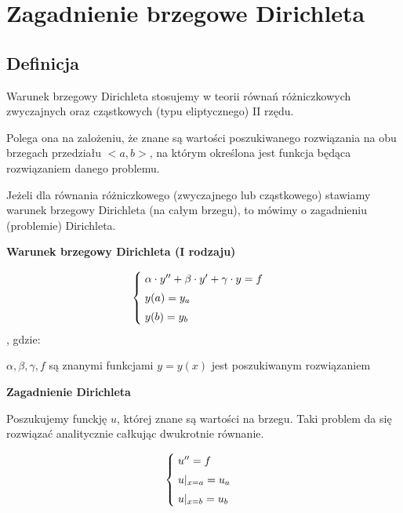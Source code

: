 \section{Zagadnienie brzegowe Dirichleta}
\subsection{Definicja}

Warunek brzegowy Dirichleta stosujemy w teorii równań różniczkowych zwyczajnych oraz cząstkowych (typu eliptycznego) II rzędu.

Polega ona na zalożeniu, że znane są wartości poszukiwanego rozwiązania na obu brzegach przedziału $<a,b>$, na którym określona jest funkcja będąca rozwiązaniem danego problemu.

Jeżeli dla równania różniczkowego (zwyczajnego lub cząstkowego) stawiamy warunek brzegowy Dirichleta (na całym brzegu), to mówimy o zagadnieniu (problemie) Dirichleta. 

\textbf{Warunek brzegowy Dirichleta (I rodzaju)}

\[
\begin{cases}
\vspace{0.1cm} 
\hspace{0,1cm}\alpha \cdot y'' + \beta \cdot y'+\gamma \cdot y=f \\
\vspace{0.1cm}
\hspace{0,1cm}y(a)=y_{a} \\
\hspace{0,1cm}y(b)=y_{b}
\end{cases}
\]
, gdzie:

$\alpha, \beta, \gamma, f$ są znanymi funkcjami
\newline
$y = y(x)$ jest poszukiwanym rozwiązaniem
\newline

\textbf{Zagadnienie Dirichleta}

Poszukujemy funckję $u$, której znane są wartości na brzegu. Taki problem da się rozwiązać analitycznie całkując dwukrotnie równanie.

\[
\begin{cases}
\vspace{0.1cm} 
\hspace{0,1cm}u''=f \\
\vspace{0.1cm}
\hspace{0,1cm}u|_{x=a}=u_{a} \\
\hspace{0,1cm}u|_{x=b}=u_{b}
\end{cases}
\]
\newline

